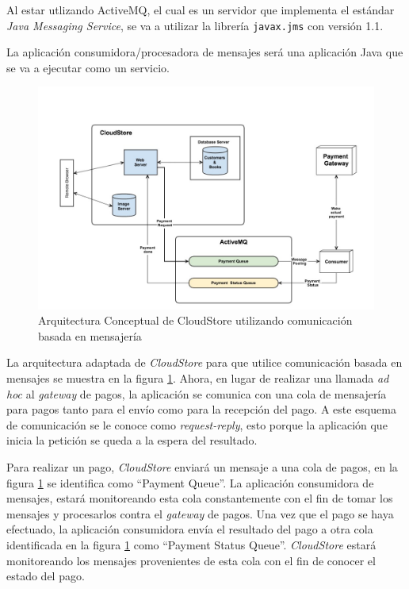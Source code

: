 \documentclass[conference]{IEEEtran}
\begin{document}
Al estar utlizando ActiveMQ, el cual es un servidor que implementa el estándar \emph{Java Messaging Service}, se va a utilizar la librería \texttt{javax.jms} con versión 1.1.

La aplicación consumidora/procesadora de mensajes será una aplicación Java que se va a ejecutar como un servicio. 

\begin{figure}[h]
  \centering
  \includegraphics[width=14cm]{cloudstore-jms}
  \caption{\small{Arquitectura Conceptual de CloudStore utilizando comunicación basada en mensajería}}
  \label{fig:cloudstore-jms}
\end{figure}

La arquitectura adaptada de \emph{CloudStore} para que utilice comunicación basada en mensajes se muestra en la figura \ref{fig:cloudstore-jms}. Ahora, en lugar de realizar una llamada \emph{ad hoc} al \emph{gateway} de pagos, la aplicación se comunica con una cola de mensajería para pagos tanto para el envío como para la recepción del pago. A este esquema de comunicación se le conoce como \emph{request-reply}, esto porque la aplicación que inicia la petición se queda a la espera del resultado.

Para realizar un pago, \emph{CloudStore} enviará un mensaje a una cola de pagos, en la figura \ref{fig:cloudstore-jms} se identifica como ``Payment Queue''. La aplicación consumidora de mensajes, estará monitoreando esta cola constantemente con el fin de tomar los mensajes y procesarlos contra el \emph{gateway} de pagos. Una vez que el pago se haya efectuado, la aplicación consumidora envía el resultado del pago a otra cola identificada en la figura \ref{fig:cloudstore-jms} como ``Payment Status Queue''. \emph{CloudStore} estará monitoreando los mensajes provenientes de esta cola con el fin de conocer el estado del pago.
\end{document}
